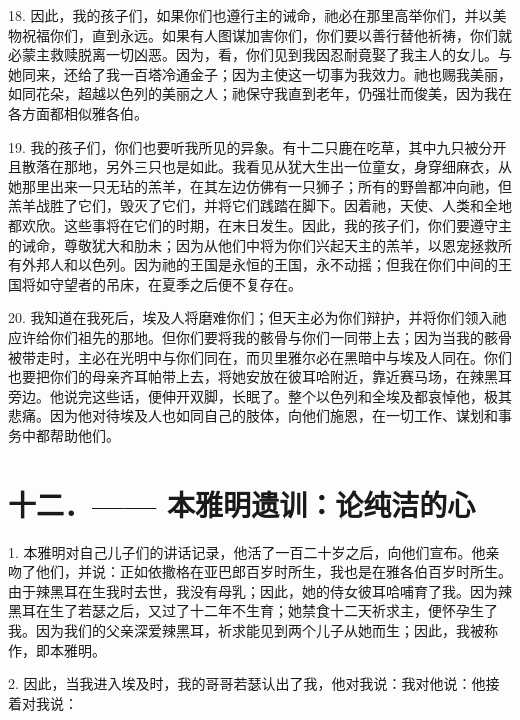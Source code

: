 18. 因此，我的孩子们，如果你们也遵行主的诫命，祂必在那里高举你们，并以美物祝福你们，直到永远。如果有人图谋加害你们，你们要以善行替他祈祷，你们就必蒙主救赎脱离一切凶恶。因为，看，你们见到我因忍耐竟娶了我主人的女儿。与她同来，还给了我一百塔冷通金子；因为主使这一切事为我效力。祂也赐我美丽，如同花朵，超越以色列的美丽之人；祂保守我直到老年，仍强壮而俊美，因为我在各方面都相似雅各伯。\par

19. 我的孩子们，你们也要听我所见的异象。有十二只鹿在吃草，其中九只被分开且散落在那地，另外三只也是如此。我看见从犹大生出一位童女，身穿细麻衣，从她那里出来一只无玷的羔羊，在其左边仿佛有一只狮子；所有的野兽都冲向祂，但羔羊战胜了它们，毁灭了它们，并将它们践踏在脚下。因着祂，天使、人类和全地都欢欣。这些事将在它们的时期，在末日发生。因此，我的孩子们，你们要遵守主的诫命，尊敬犹大和肋未；因为从他们中将为你们兴起天主的羔羊，以恩宠拯救所有外邦人和以色列。因为祂的王国是永恒的王国，永不动摇；但我在你们中间的王国将如守望者的吊床，在夏季之后便不复存在。\par

20. 我知道在我死后，埃及人将磨难你们；但天主必为你们辩护，并将你们领入祂应许给你们祖先的那地。但你们要将我的骸骨与你们一同带上去；因为当我的骸骨被带走时，主必在光明中与你们同在，而贝里雅尔必在黑暗中与埃及人同在。你们也要把你们的母亲齐耳帕带上去，将她安放在彼耳哈附近，靠近赛马场，在辣黑耳旁边。他说完这些话，便伸开双脚，长眠了。整个以色列和全埃及都哀悼他，极其悲痛。因为他对待埃及人也如同自己的肢体，向他们施恩，在一切工作、谋划和事务中都帮助他们。\par


\section{十二．—— 本雅明遗训：论纯洁的心}

1. 本雅明对自己儿子们的讲话记录，他活了一百二十岁之后，向他们宣布。他亲吻了他们，并说：正如依撒格在亚巴郎百岁时所生，我也是在雅各伯百岁时所生。由于辣黑耳在生我时去世，我没有母乳；因此，她的侍女彼耳哈哺育了我。因为辣黑耳在生了若瑟之后，又过了十二年不生育；她禁食十二天祈求主，便怀孕生了我。因为我们的父亲深爱辣黑耳，祈求能见到两个儿子从她而生；因此，我被称作，即本雅明。\par

2. 因此，当我进入埃及时，我的哥哥若瑟认出了我，他对我说：我对他说：他接着对我说：\par

